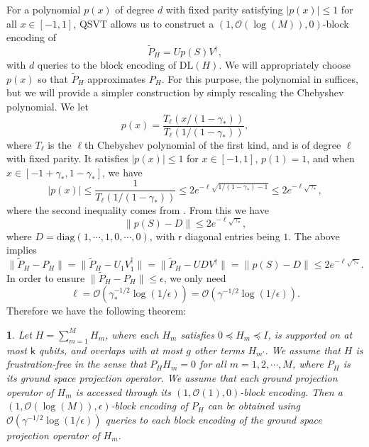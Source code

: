 \documentclass{article}
\newtheorem{thm}{\protect\theoremname}
\theoremstyle{plain}
\theoremstyle{plain}
\theoremstyle{plain}
\theoremstyle{plain}
\theoremstyle{plain}
\theoremstyle{plain}
\theoremstyle{plain}
\providecommand{\theoremname}{Theorem}
\newcommand{\Or}{\mathcal{O}}
\begin{document}
For a polynomial $p(x)$ of degree $d$ with fixed parity satisfying $|p(x)|\leq 1$ for all $x\in[-1,1]$, QSVT allows us to construct a $(1,\Or(\log(M)),0)$-block encoding of 
\begin{equation}
    \tilde{P}_H = U p(S) V^\dag,
\end{equation}
with $d$ queries to the block encoding of $\mathrm{DL}(H)$. We will appropriately choose $p(x)$ so that $\tilde{P}_H$ approximates $P_H$. For this purpose, the polynomial in \cite{ThibodeauClark2023nearly} suffices, but we will provide a simpler construction by simply rescaling the Chebyshev polynomial. We let 
\begin{equation}
    \label{eq:choice_for_poly_p}
    p(x) = \frac{T_{\ell}\left(x/(1-\gamma_*)\right)}{T_{\ell}\left(1/(1-\gamma_*)\right)},
\end{equation}
where $T_\ell$ is the $\ell$th Chebyshev polynomial of the first kind, and is of degree $\ell$ with fixed parity. It satisfies $|p(x)|\leq 1$ for $x\in[-1,1]$, $p(1)=1$, and when $x\in[-1+\gamma_*,1-\gamma_*]$, we have
\[
|p(x)|\leq \frac{1}{T_{\ell}\left(1/(1-\gamma_*)\right)}\leq 2e^{-\ell \sqrt{1/(1-\gamma_*)-1}}\leq 2e^{-\ell\sqrt{\gamma_*}},
\]
where the second inequality comes from \cite[Lemma~13]{LinTong2020optimal}. From this we have
\[
\|p(S)-D\|\leq 2e^{-\ell\sqrt{\gamma_*}},
\]
where $D=\mathrm{diag}(1,\cdots,1,0,\cdots,0)$, with $\mathsf{r}$ diagonal entries being $1$. The above implies
\begin{equation}
    \label{eq:approximate_proj_op_error_bound}
    \|\tilde{P}_H-P_H\|=\|\tilde{P}_H-U_1 V_1^\dag\|=\|\tilde{P}_H-UDV^\dag\|=\|p(S)-D\|\leq 2e^{-\ell\sqrt{\gamma_*}}.
\end{equation}
In order to ensure $\|\tilde{P}_H-P_H\|\leq \epsilon$, we only need
\begin{equation}
    \label{eq:choice_of_ell}
    \ell = \Or(\gamma_*^{-1/2}\log(1/\epsilon))=\Or(\gamma^{-1/2}\log(1/\epsilon)).
\end{equation}
Therefore we have the following theorem:
\begin{thm}
    \label{thm:block_encode_proj}
    Let $H = \sum_{m=1}^M H_m$, where each $H_m$ satisfies $0\preceq H_m\preceq I$, is supported on at most $\mathsf{k}$ qubits, and overlaps with at most $g$ other terms $H_{m'}$. We assume that $H$ is frustration-free in the sense that $P_H H_m=0$ for all $m=1,2,\cdots,M$, where $P_H$ is its ground space projection operator. 
    We assume that each ground projection operator of $H_m$ is accessed through its $(1,\Or(1),0)$-block encoding.
    Then a $(1,\Or(\log(M)),\epsilon)$-block encoding of $P_H$ can be obtained using $\Or(\gamma^{-1/2}\log(1/\epsilon))$ queries to each block encoding of the ground space projection operator of $H_m$.
\end{thm}
\end{document}

